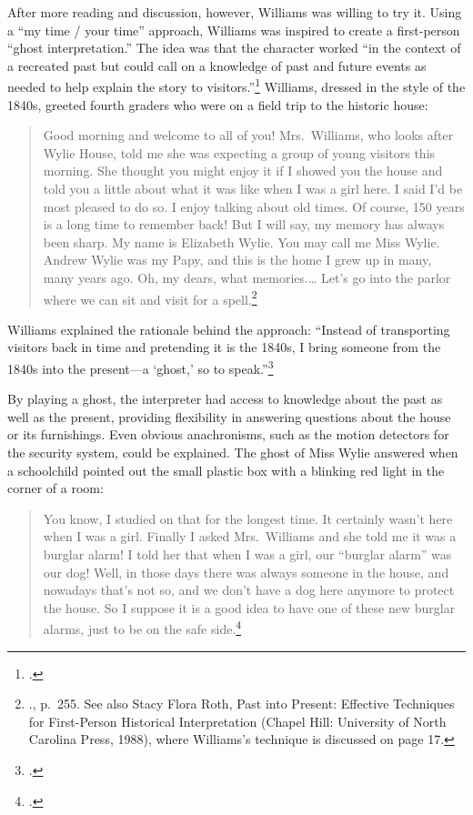 \documentclass[
  american,
  letterpaper,
]{scrreprt}
\begin{document}
After more reading and discussion, however, Williams was willing to try
it. Using a ``my time / your time'' approach, Williams was inspired to
create a first-person ``ghost interpretation.'' The idea was that the
character worked ``in the context of a recreated past but could call on
a knowledge of past and future events as needed to help explain the
story to visitors.''\footnote{.} Williams, dressed in the style of the 1840s, greeted fourth
graders who were on a field trip to the historic house:

\begin{quote}
Good morning and welcome to all of you! Mrs.~Williams, who looks after
Wylie House, told me she was expecting a group of young visitors this
morning. She thought you might enjoy it if I showed you the house and
told you a little about what it was like when I was a girl here. I said
I'd be most pleased to do so. I enjoy talking about old times. Of
course, 150 years is a long time to remember back! But I will say, my
memory has always been sharp. My name is Elizabeth Wylie. You may call
me Miss Wylie. Andrew Wylie was my Papy, and this is the home I grew up
in many, many years ago. Oh, my dears, what memories.\ldots{} Let's go
into the parlor where we can sit and visit for a spell.\footnote{{.}, p.~255. See also Stacy Flora Roth,
  Past into Present: Effective Techniques for First-Person Historical
  Interpretation (Chapel Hill: University of North Carolina Press,
  1988), where Williams's technique is discussed on page 17.}
\end{quote}

Williams explained the rationale behind the approach: ``Instead of
transporting visitors back in time and pretending it is the 1840s, I
bring someone from the 1840s into the present---a `ghost,' so to
speak.''\footnote{.}

By playing a ghost, the interpreter had access to knowledge about the
past as well as the present, providing flexibility in answering
questions about the house or its furnishings. Even obvious anachronisms,
such as the motion detectors for the security system, could be
explained. The ghost of Miss Wylie answered when a schoolchild pointed
out the small plastic box with a blinking red light in the corner of a
room:

\begin{quote}
You know, I studied on that for the longest time. It certainly wasn't
here when I was a girl. Finally I asked Mrs.~Williams and she told me it
was a burglar alarm! I told her that when I was a girl, our ``burglar
alarm'' was our dog! Well, in those days there was always someone in the
house, and nowadays that's not so, and we don't have a dog here anymore
to protect the house. So I suppose it is a good idea to have one of
these new burglar alarms, just to be on the safe side.\footnote{.}
\end{quote}
\end{document}
